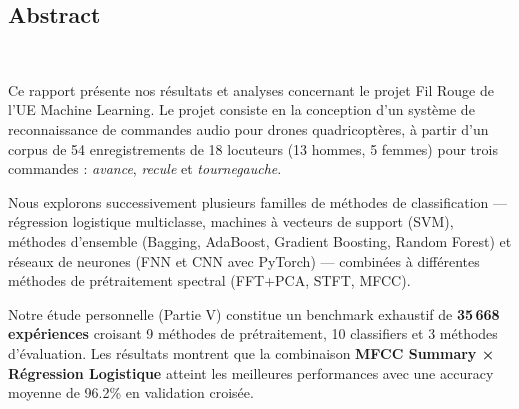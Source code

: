 \documentclass{name}
\begin{document}






        
\fairemarges %
\fairepagedegarde %

\newpage
\setcounter{pagezero}{\value{0}}

\begin{center}
	\begin{minipage}{13cm}
	    \begin{center}
	        \section*{Abstract}\\
	    \end{center}
		Ce rapport présente nos résultats et analyses concernant le projet Fil Rouge de l'UE Machine Learning. Le projet consiste en la conception d'un système de reconnaissance de commandes audio pour drones quadricoptères, à partir d'un corpus de 54 enregistrements de 18 locuteurs (13 hommes, 5 femmes) pour trois commandes : \textit{avance}, \textit{recule} et \textit{tournegauche}.
		
		Nous explorons successivement plusieurs familles de méthodes de classification — régression logistique multiclasse, machines à vecteurs de support (SVM), méthodes d'ensemble (Bagging, AdaBoost, Gradient Boosting, Random Forest) et réseaux de neurones (FNN et CNN avec PyTorch) — combinées à différentes méthodes de prétraitement spectral (FFT+PCA, STFT, MFCC).
		
		Notre étude personnelle (Partie V) constitue un benchmark exhaustif de \textbf{35\,668 expériences} croisant 9 méthodes de prétraitement, 10 classifiers et 3 méthodes d'évaluation. Les résultats montrent que la combinaison \textbf{MFCC Summary × Régression Logistique} atteint les meilleures performances avec une accuracy moyenne de 96.2\% en validation croisée.
	\end{minipage}
\end{center}
\end{document}
